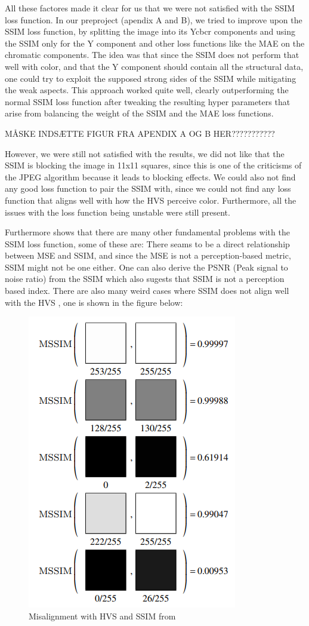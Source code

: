 All these factores made it clear for us that we were not satisfied with the SSIM loss function. In our preproject (apendix A and B), we tried to improve upon the SSIM loss function, by splitting the image into its Ycbcr components and using the SSIM only for the Y component and other loss functions like the MAE on the chromatic components. The idea was that since the SSIM does not perform that well with color, and that the Y component should contain all the structural data, one could try to exploit the supposed strong sides of the SSIM while mitigating the weak aspects. This approach worked quite well, clearly outperforming the normal SSIM loss function after tweaking the resulting hyper parameters that arise from balancing the weight of the SSIM and the MAE loss functions. 

MÅSKE INDSÆTTE FIGUR FRA APENDIX A OG B HER???????????

However, we were still not satisfied with the results, we did not like that the SSIM is blocking the image in 11x11 squares, since this is one of the criticisms of the JPEG algorithm because it leads to blocking effects\cite{benchmark}\cite{JPEG}\cite{JPEG1.02}. We could also not find any good loss function to pair the SSIM with, since we could not find any loss function that aligns well with how the HVS perceive color. Furthermore, all the issues with the loss function being unstable were still present.

Furthermore \cite{ssimbad} shows that there are many other fundamental problems with the SSIM loss function, some of these are: There seams to be a direct relationship between MSE and SSIM, and since the MSE is not a perception-based metric, SSIM might not be one either\cite{ssimbad}. One can also derive the PSNR (Peak signal to noise ratio) from the SSIM which also sugests that SSIM is not a perception based index\cite{ssimbad}. There are also many weird cases where SSIM does not align well with the HVS \cite{ssimbad}, one is shown in the figure below:%
\begin{figure}[H]
    \centering
    \includegraphics[width=0.40\linewidth,origin=c]{Report/Pictures/LossFuntion/SSIMBad.png}
    \caption{Misalignment with HVS and SSIM from\cite{ssimbad}}
    \label{Misalignment HVS SSIM}
\end{figure}

